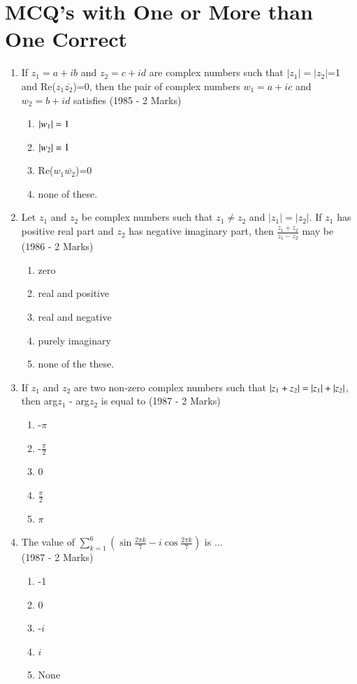 \documentclass[journal,12pt,twocolumn]{IEEEtran}
\theoremstyle{remark}
\begin{document}
\section{ MCQ's with One or More than One Correct}
\begin{enumerate}
	\item If $z_{1}=a+ib$ and $z_{2}=c+id$ are complex numbers such that $|z_{1}|=|z_{2}|$=1 and Re($z_{1}\overline{z_{2}}$)=0, then the pair of complex numbers $w_{1}=a+ic$ and $w_{2}=b+id$ satisfies \hfill{(1985 - 2 Marks)}
\begin{enumerate}[label=(\alph*)]
	\item $\left\vert w_{1}\right\vert=1$
	\item $\left\vert w_{2}\right\vert=1$
	\item Re($w_{1}\overline{w_{2}}$)=0
	\item none of these.
\end{enumerate}
\item Let $z_{1}$ and $z_{2}$ be complex numbers such that $z_{1}\neq z_{2}$ and $|z_{1}|=|z_{2}|$. If $z_{1}$ has positive real part and $z_{2}$ has negative imaginary part, then $\frac{z_{1}+z_{2}}{z_{1}-z_{2}}$ may be \hfill{(1986 - 2 Marks)}
\begin{enumerate}[label=(\alph*)]
	\item zero
	\item real and positive
	\item real and negative
	\item purely imaginary
	\item none of the these.
\end{enumerate}
\item If $z_{1}$ and $z_{2}$ are two non-zero complex numbers such that $\left\vert z_{1}+z_{2}\right\vert=\left\vert z_{1}\right\vert+\left\vert z_{2}\right\vert$, then arg$z_{1}$ - arg$z_{2}$ is equal to \hfill{(1987 - 2 Marks)}
\begin{enumerate}[label=(\alph*)]
	\item -$\pi$
	\item -$\frac{\pi}{2}$
        \item 0
        \item $\frac{\pi}{2}$
	\item $\pi$
\end{enumerate}
\item The value of $\sum_{k=1} ^{6} (\sin \frac{2\pi k}{7}-i\cos \frac{2\pi k}{7})$ is                     ...\\

	\hfill{(1987 - 2 Marks)}
\begin{enumerate}[label=(\alph*)]
	
	\item -1
	\item 0
	\item -$i$
	\item $i$
	\item None
\end{enumerate}

\end{enumerate}

\renewcommand{\thefigure}{\theenumi}
\renewcommand{\thetable}{\theenumi}
\end{document}
